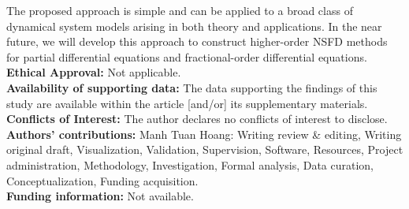 \documentclass[12pt]{article}
\theoremstyle{definition}
\theoremstyle{remark}
\numberwithin{equation}{section}
\begin{document}
The proposed approach is simple and can be applied to a broad class of dynamical system models arising in both theory and applications. In the near future, we will develop this approach to construct higher-order NSFD methods for partial differential equations and fractional-order differential equations.\\
\textbf{Ethical Approval:} Not applicable.\\
\textbf{Availability of supporting data:} The data supporting the findings of this study are available within the article [and/or] its supplementary materials.\\
\textbf{Conflicts of Interest:} The author declares no conflicts of interest to disclose.\\
\textbf{Authors' contributions:} Manh Tuan Hoang:  Writing review \& editing, Writing original draft, Visualization, Validation, Supervision, Software, Resources, Project administration, Methodology, Investigation,
Formal analysis, Data curation, Conceptualization, Funding acquisition.\\
\textbf{Funding information:} Not available.

\end{document}
